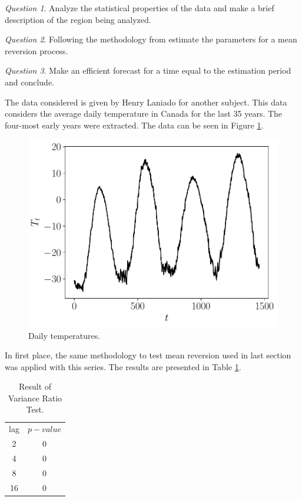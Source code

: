 \documentclass[11pt]{article}
\theoremstyle{definition}
\theoremstyle{remark}
\theoremstyle{remark}
\newtheorem{question}{Question}
\begin{document}
\begin{question}
  Analyze the statistical properties of the data and make a brief
  description of the region being analyzed.
\end{question}

\begin{question}
  Following the methodology from \parencite{alaton2002} estimate the
  parameters for a mean reversion process.
\end{question}

\begin{question}
  Make an efficient forecast for a time equal to the estimation
  period and conclude.
\end{question}

The data considered is given by Henry Laniado for another
subject. This data considers the average daily temperature in Canada
for the last 35 years. The four-most early years were extracted.
The data can be seen in Figure \ref{fig:series3}.

\begin{figure}[H]
  \centering
  \includegraphics[scale=0.5]{temps.pdf}
  \caption{Daily temperatures.}
  \label{fig:series3}
\end{figure}

In first place, the same methodology to test mean reversion used in
last section was applied with this series. The results are presented
in Table \ref{tab:lags3}.

\begin{table}[H]
  \centering
  \begin{tabular}{cc}
    \hline
    lag & $p-value$   \\
    2   & 0 \\
    4   & 0     \\
    8   & 0     \\
    16  & 0 \\ \hline
  \end{tabular}
  \caption{Result of Variance Ratio Test.}
  \label{tab:lags3}
\end{table}
\end{document}
